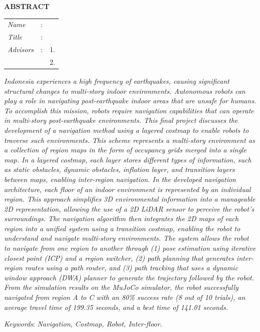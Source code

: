 \begin{center}
  \large\textbf{ABSTRACT}
\end{center}


\vspace{2ex}

\begingroup
\setlength{\tabcolsep}{0pt}

\noindent
\begin{tabularx}{\textwidth}{l >{\centering}m{3em} X}
  \emph{Name}     & : & \name{}         \\

  \emph{Title}    & : & \engtatitle{}   \\

  \emph{Advisors} & : & 1. \advisor{}   \\
                  &   & 2. \coadvisor{} \\
\end{tabularx}
\endgroup

\emph{%
Indonesia experiences a high frequency of earthquakes, causing significant structural
changes to multi-story \emph{indoor} environments. Autonomous robots can play a role in
navigating post-earthquake \emph{indoor} areas that are unsafe for humans. To accomplish
this mission, robots require navigation capabilities that can operate in multi-story
post-earthquake environments.
This final project discusses the development of a navigation method using a \emph{layered
costmap} to enable robots to traverse such environments. This scheme represents a
multi-story environment as a collection of \emph{region} maps in the form of \emph{occupancy
grids} merged into a single \emph{map}. In a \emph{layered costmap}, each layer stores
different types of information, such as static obstacles, dynamic obstacles, inflation
layer, and transition layers between \emph{maps}, enabling inter-\emph{region}
navigation. In the developed navigation architecture, each floor of an \emph{indoor}
environment is represented by an individual \emph{region}. This approach simplifies 3D
environmental information into a manageable 2D representation, allowing the use of a 2D
\emph{LiDAR} sensor to perceive the robot's surroundings. The navigation algorithm then
integrates the 2D \emph{maps} of each \emph{region} into a unified system using a
transition \emph{costmap}, enabling the robot to understand and navigate multi-story
environments. The system allows the robot to navigate from one \emph{region} to another
through (1) pose estimation using \emph{iterative closest point} (ICP) and a \emph{region
switcher}, (2) \emph{path planning} that generates inter-\emph{region} routes using a
\emph{path router}, and (3) \emph{path tracking} that uses a \emph{dynamic window
approach} (DWA) \emph{planner} to generate the \emph{trajectory} followed by the robot.
From the simulation results on the MuJoCo simulator, the robot successfully navigated
from \emph{region} A to C with an 80\% success rate (8 out of 10 trials), an average
travel time of 199.35 seconds, and a best time of 141.01 seconds.}

\emph{Keywords}: \emph{Navigation, Costmap, Robot, Inter-floor}.
